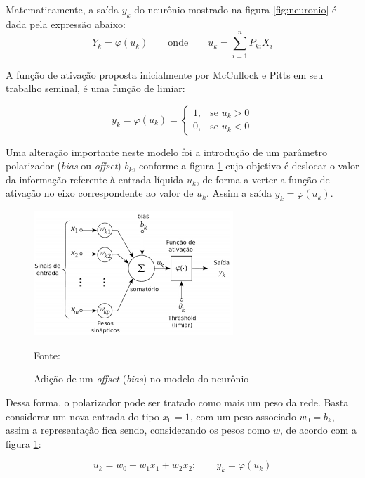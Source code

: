 Matematicamente, a saída $y_k$ do neurônio mostrado na figura \ref{fig:neuronio} é dada pela expressão abaixo:
\begin{equation}
	Y_k = \varphi(u_k) \qquad \textrm{onde} \qquad u_k = \sum_{i=1}^{n} P_{ki}X_i 
\end{equation}

A função de ativação proposta inicialmente por McCullock e Pitts em seu trabalho seminal, \cite{mcculloch_logical_1943} é uma função de limiar:

\begin{equation}\label{funcao_limiar}
y_k = \varphi (u_k) = \left \{ \begin{matrix}
									1, & \mbox{se }u_k > 0 \\ 
									0, & \mbox{se }u_k < 0 
								\end{matrix} 
							\right.
\end{equation}

Uma alteração importante neste modelo foi a introdução de um parâmetro polarizador (\textit{bias} ou \textit{offset}) $b_k$, conforme a figura \ref{fig:bias_neuronio} cujo objetivo é deslocar o valor da informação referente à entrada líquida $u_k$, de forma a verter a função de ativação no eixo correspondente ao valor de $u_k$. Assim a saída $y_k = \varphi(u_k)$.

\begin{figure}[h!]
	\centering
	\includegraphics[width=.5\textwidth]{imagens/bias_neuronio.png}	
	\caption{Adição de um \textit{offset} (\textit{bias}) no modelo do neurônio}
	{\scriptsize 	Fonte: \cite[p. 58]{lima_ia_2016}}
	\label{fig:bias_neuronio}
\end{figure}

Dessa forma, o polarizador pode ser tratado como mais um peso da rede. Basta considerar um nova entrada do tipo $x_0 = 1$, com um peso associado $w_0 = b_k$, assim a representação fica sendo, considerando os pesos como $w$, de acordo com a figura \ref{fig:bias_neuronio}:

\begin{equation}
	u_k = w_0 + w_1x_1 + w_2x_2; \qquad y_k = \varphi(u_k)
\end{equation}

